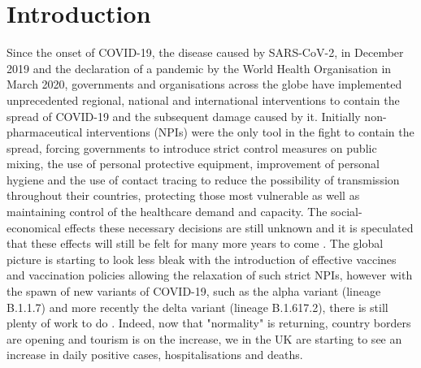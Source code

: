 \documentclass{article}
\begin{document}
\section{Introduction}

Since the onset of COVID-19, the disease caused by SARS-CoV-2, in December 2019 and the declaration of a pandemic by the World Health Organisation in March 2020, governments and organisations across the globe have implemented unprecedented regional, national and international interventions to contain the spread of COVID-19 and the subsequent damage caused by it. Initially non-pharmaceutical interventions (NPIs) were the only tool in the fight to contain the spread, forcing governments to introduce strict control measures on public mixing, the use of personal protective equipment, improvement of personal hygiene and the use of contact tracing to reduce the possibility of transmission throughout their countries, protecting those most vulnerable as well as maintaining control of the healthcare demand and capacity. The social-economical effects these necessary decisions are still unknown and it is speculated that these effects will still be felt for many more years to come \cite{DKTMM20,CGK20,PN20,NASal20}. The global picture is starting to look less bleak with the introduction of effective vaccines and vaccination policies allowing the relaxation of such strict NPIs, however with the spawn of new variants of COVID-19, such as the alpha variant (lineage B.1.1.7) and more recently the delta variant (lineage B.1.617.2), there is still plenty of work to do \cite{HFJK21,HHZADD21,DABal21,MHTDK21}. Indeed, now that "normality" is returning, country borders are opening and tourism is on the increase, we in the UK are starting to see an increase in daily positive cases, hospitalisations and deaths. 
\end{document}
